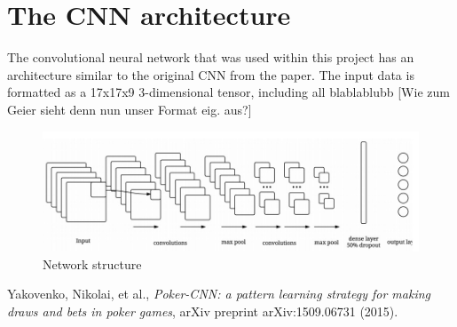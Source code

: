 \documentclass[]{report}
\begin{document}
\section{The CNN architecture}

The convolutional neural network that was used within this project has an architecture similar to the original CNN from the paper\cite{1}. The input data is formatted as a 17x17x9 3-dimensional tensor, including all blablablubb [Wie zum Geier sieht denn nun unser Format eig. aus?]


\begin{figure}[h]
\caption{Network structure}
\includegraphics[scale = 0.5]{cnn_structure.jpg}
\end{figure}


\begin{thebibliography}{}
	 Yakovenko, Nikolai, et al., \emph{Poker-CNN: a pattern learning strategy for making draws and bets in poker games}, arXiv preprint arXiv:1509.06731 (2015).
\end{thebibliography}  
\end{document}
